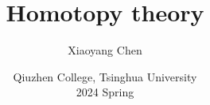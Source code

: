 \documentclass[oneside,11pt]{book}
\title{
    \huge{Homotopy theory}
    \vspace{0.4\paperheight}
}
\author{
    \Large{Xiaoyang Chen}\\
    \vspace{0.1\paperheight}
}
\date{
    \Large{Qiuzhen College, Tsinghua University}\\
    \Large{2024 Spring}
}
\theoremstyle{plain}\newtheorem{thm}{Theorem}
\theoremstyle{definition}\newtheorem{defn}[thm]{Definition}
\theoremstyle{definition}\newtheorem{fact}[thm]{Fact}
\theoremstyle{plain}\newtheorem{axiom}[thm]{Axiom}
\theoremstyle{plain}\newtheorem{coro}[thm]{Corollary}
\theoremstyle{plain}\newtheorem{lemma}[thm]{Lemma}
\theoremstyle{plain}\newtheorem{prop}[thm]{Proposition}
\theoremstyle{plain}\newtheorem{conj}[thm]{Conjecture}
\theoremstyle{plain}\newtheorem{ques}[thm]{Problem}
\theoremstyle{definition}\newtheorem{const}[thm]{Construction}
\theoremstyle{definition}\newtheorem{cond}[thm]{Condition}
\theoremstyle{remark}\newtheorem{notation}[thm]{Notation}
\theoremstyle{plain}\newtheorem{app}{Application}
\theoremstyle{plain}\newtheorem{exam}{Example}
\theoremstyle{plain}\newtheorem{exer}{Exercise}
\theoremstyle{remark}\newtheorem{remark}{Remark}
\theoremstyle{remark}\newtheorem*{note}{\small{Note}}
\numberwithin{equation}{section}
\numberwithin{thm}{section}
\begin{document}
\maketitle
\frontmatter
\tableofcontents
\newpage

\mainmatter{}







\end{document}
